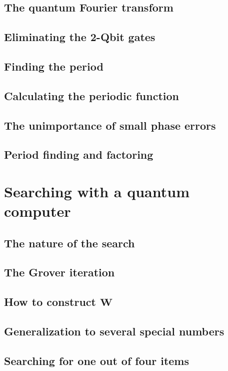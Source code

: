 \documentclass{book}
\theoremstyle{definition}
\begin{document}
\subsection{The quantum Fourier transform}
\subsection{Eliminating the 2-Qbit gates}
\subsection{Finding the period}
\subsection{Calculating the periodic function}
\subsection{The unimportance of small phase errors}
\subsection{Period finding and factoring}


\newpage

\section{Searching with a quantum computer}

\subsection{The nature of the search}
\subsection{The Grover iteration}
\subsection{How to construct $\mathbf{W}$}
\subsection{Generalization to several special numbers}
\subsection{Searching for one out of four items}
\end{document}
